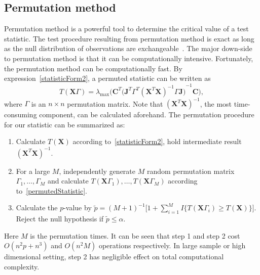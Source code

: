\documentclass[12pt]{article} %
\newcommand{\bX}{\mathbf{X}}
\newcommand{\bJ}{\mathbf{J}}
\newcommand{\bC}{\mathbf{C}}
\theoremstyle{definition}
\begin{document}
\subsection{Permutation method}
Permutation method is a powerful tool to determine the critical value of a test statistic.
   The test procedure resulting from permutation method is exact as long as the null distribution of observations are exchangeable~\citep{Romano1990On}.
   The major down-side to permutation method is that it can be computationally intensive.
   Fortunately,  the permutation method can be computationally fast.
    By expression~\eqref{statisticForm2}, a permuted statistic can be written as
    \begin{equation}\label{permutedStatistic}
        T(\bX\Gamma)=\lambda_{\max}\Big(\bC^T{\big( \bJ^T \Gamma^T {(\bX^T \bX)}^{-1} \Gamma \bJ \big)}^{-1}  \bC\Big),
    \end{equation}
where $\Gamma$ is an $n\times n$ permutation matrix.
   Note that ${(\bX^T \bX)}^{-1}$, the most time-consuming component, can be calculated aforehand.
   The permutation procedure for our statistic can be summarized as:
   \begin{enumerate}
       \item
           Calculate $T(\bX)$ according to~\eqref{statisticForm2}, hold intermediate result ${(\bX^T \bX)}^{-1}$.
       \item For a large $M$, independently generate $M$ random permutation matrix $\Gamma_1,\ldots,\Gamma_M$ and calculate $T(\bX\Gamma_1),\ldots,T(\bX\Gamma_M)$ according to~\eqref{permutedStatistic}. 
       \item Calculate the $p$-value by
           $
           \tilde{p}={(M+1)}^{-1}\big[1+\sum_{i=1}^M I\{T(\bX\Gamma_i)\geq T(\bX)\}\big]
           $.
           Reject the null hypothesis if $\tilde{p}\leq \alpha$.
   \end{enumerate}

Here $M$ is the permutation times. 
   It can be seen that  step 1 and step 2 cost $O(n^2 p +n^3)$ and $O(n^2 M)$ operations respectively.
   In large sample or high dimensional setting, step 2 has negligible effect on total computational complexity.
\end{document}
